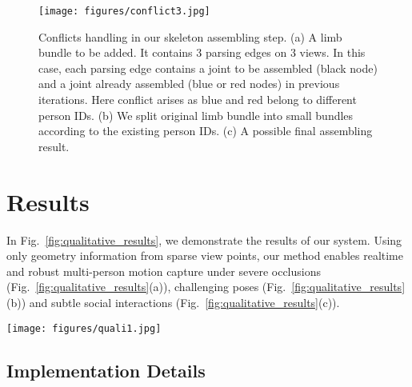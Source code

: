 \documentclass[10pt,twocolumn,letterpaper]{article}
\begin{document}
\begin{figure}
    \centering
    \texttt{[image: figures/conflict3.jpg]}
    \vspace{-3mm}
    \caption{Conflicts handling in our skeleton assembling step.
    (a) A limb bundle to be added. It contains 3 parsing edges on 3 views. In this case, each parsing edge contains a joint to be assembled (black node) and a joint already assembled (blue or red nodes) in previous iterations.
    Here conflict arises as blue and red belong to different person IDs. (b) We split original limb bundle into small bundles according to the existing person IDs. (c) A possible final assembling result.
    }
    \label{fig:bundle}
    \vspace{-3mm}
\end{figure}

%
 




\section{Results}
\label{sec:result}

In Fig.~\ref{fig:qualitative_results}, we demonstrate the results of our system. Using only geometry information from sparse view points, our method enables realtime and robust multi-person motion capture under severe occlusions (Fig.~\ref{fig:qualitative_results}(a)), challenging poses (Fig.~\ref{fig:qualitative_results}(b)) and subtle social interactions (Fig.~\ref{fig:qualitative_results}(c)).

\begin{figure*}[ht]
\begin{center}
  \texttt{[image: figures/quali1.jpg]}
\end{center}
\caption{Results of our system. From top to bottom: input images, reprojection of 3D human, and 3D visualization respectively. (a) Our live captured data with fast motion (left), severe occlusion (middle) and crowded scene (right). 5 views used. (b) Our dataset with textureless clothing and rich motion. 6 views used. (c) Panoptic studio dataset with natural social interaction. 7 views used. }
\label{fig:qualitative_results}
\vspace{-3mm}
\end{figure*}

\subsection{Implementation Details}
\label{sec:system}
\end{document}
